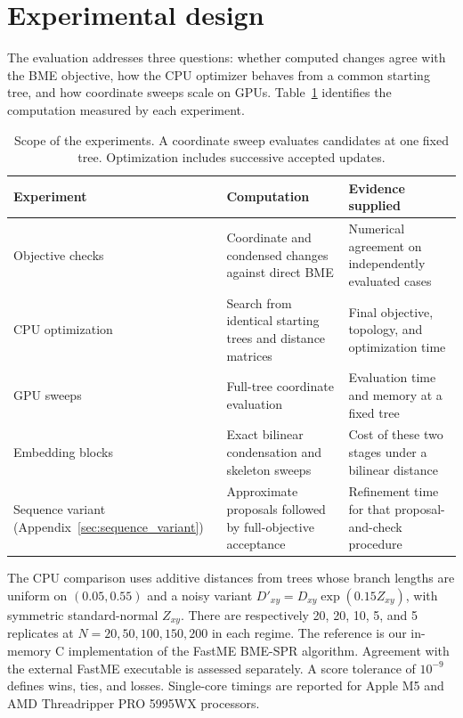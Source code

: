 \documentclass[11pt,a4paper]{article}
\makeatletter
\DeclareRobustCommand{\_}{\ifmmode\nfss@text{\textunderscore}\else\textunderscore\allowbreak\fi}
\theoremstyle{definition}
\makeatother
\begin{document}
\section{Experimental design}
\label{sec:experiments}

The evaluation addresses three questions: whether computed changes agree with the BME objective, how the CPU optimizer behaves from a common starting tree, and how coordinate sweeps scale on GPUs.
Table~\ref{tab:experiment_scope} identifies the computation measured by each experiment.

\begin{table}[!htbp]
\centering\small
\caption{Scope of the experiments. A coordinate sweep evaluates candidates at one fixed tree. Optimization includes successive accepted updates.}
\label{tab:experiment_scope}
\begin{tabular}{@{}>{\raggedright\arraybackslash}p{.23\linewidth}>{\raggedright\arraybackslash}p{.36\linewidth}>{\raggedright\arraybackslash}p{.35\linewidth}@{}}
\toprule
Experiment & Computation & Evidence supplied\\
\midrule
Objective checks & Coordinate and condensed changes against direct BME & Numerical agreement on independently evaluated cases\\[3pt]
CPU optimization & Search from identical starting trees and distance matrices & Final objective, topology, and optimization time\\[3pt]
GPU sweeps & Full-tree coordinate evaluation & Evaluation time and memory at a fixed tree\\[3pt]
Embedding blocks & Exact bilinear condensation and skeleton sweeps & Cost of these two stages under a bilinear distance\\[3pt]
Sequence variant (Appendix~\ref{sec:sequence_variant}) & Approximate proposals followed by full-objective acceptance & Refinement time for that proposal-and-check procedure\\
\bottomrule
\end{tabular}
\end{table}

The CPU comparison uses additive distances from trees whose branch lengths are uniform on $(0.05,0.55)$ and a noisy variant
$D'_{xy}=D_{xy}\exp(0.15Z_{xy})$, with symmetric standard-normal $Z_{xy}$.
There are respectively 20, 20, 10, 5, and 5 replicates at
$N=20,50,100,150,200$ in each regime.
The reference is our in-memory C implementation of the FastME BME-SPR algorithm.
Agreement with the external FastME executable is assessed separately.
A score tolerance of $10^{-9}$ defines wins, ties, and losses.
Single-core timings are reported for Apple M5 and AMD Threadripper PRO 5995WX processors.
\end{document}
